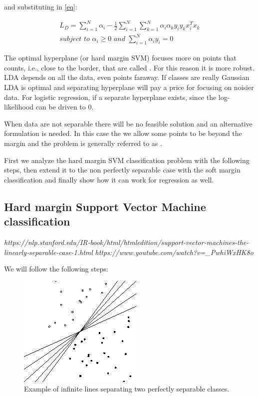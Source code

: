and substituting in \autoref{eq}:

\begin{equation}
\begin{aligned}
L_D = \sum_{i=1}^N \alpha_i -\frac{1}{2}\sum_{i=1}^N\sum_{k=1}^N \alpha_i \alpha_ky_iy_kx_i^Tx_k\\
\textit{subject to } \alpha_i\ge0 \textit{ and } \sum_{i=1}^N \alpha_iy_i=0
\end{aligned}
\end{equation}
\fi

The optimal hyperplane (or hard margin SVM) focuses more on points that counts, i.e., close to the border, that are called . For this reason it is more robust. LDA depends on all the data, even points faraway. If classes are really Gaussian LDA is optimal and separating hyperplane will pay a price for focusing on noisier data.
For logistic regression, if a separate hyperplane exists, since the log-likelihood can be driven to $0$.

When data are not separable there will be no feasible solution and an alternative formulation is needed. In this case the we allow some points to be beyond the margin and the problem is generally referred to as .

First we analyze the hard margin SVM classification problem with the following steps, then extend it to the non perfectly separable case with the soft margin classification and finally show how it can work for regression as well.

\subsection{Hard margin Support Vector Machine classification}
\label{HardMarginSVM}
\textit{https://nlp.stanford.edu/IR-book/html/htmledition/support-vector-machines-the-linearly-separable-case-1.html}
\textit{https://www.youtube.com/watch?v=\_PwhiWxHK8o}

We will follow the following steps:

\begin{figure}
\centering
\includegraphics[scale=0.6]{img/separableClasses}
\caption{Example of infinite lines separating two perfectly separable classes.}
\label{separableClasses}
\end{figure}

